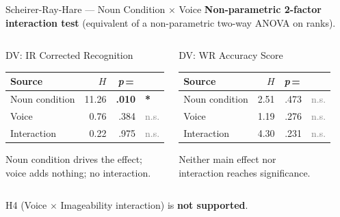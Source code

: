 \documentclass[aspectratio=169, 10pt]{beamer}
\newcommand{\pval}[1]{\textit{p}\,=\,#1}
\newcommand{\sig}[1]{\textcolor{red!70!black}{\textbf{#1}}}
\newcommand{\ns}[1]{\textcolor{gray}{#1}}
\begin{document}
\begin{frame}{Scheirer-Ray-Hare — Noun Condition $\times$ Voice}
  \textbf{Non-parametric 2-factor interaction test} (equivalent of a
  non-parametric two-way ANOVA on ranks).
  \vspace{0.5em}
  \begin{columns}[T]
      \begin{block}{DV: IR Corrected Recognition}
        \small
        \renewcommand{\arraystretch}{1.2}
        \begin{tabular}{lrrl}
          \toprule
          Source & $H$ & \pval{} & \\
          \midrule
          Noun condition & 11.26 & \sig{.010} & \sig{*} \\
          Voice          &  0.76 & .384 & \ns{n.s.} \\
          Interaction    &  0.22 & .975 & \ns{n.s.}  \\
          \bottomrule
        \end{tabular}
        \vspace{4pt}
        Noun condition drives the effect;\\
        voice adds nothing; no interaction.
      \end{block}

      \begin{block}{DV: WR Accuracy Score}
        \small
        \renewcommand{\arraystretch}{1.2}
        \begin{tabular}{lrrl}
          \toprule
          Source & $H$ & \pval{} & \\
          \midrule
          Noun condition &  2.51 & .473 & \ns{n.s.} \\
          Voice          &  1.19 & .276 & \ns{n.s.} \\
          Interaction    &  4.30 & .231 & \ns{n.s.}  \\
          \bottomrule
        \end{tabular}
        \vspace{4pt}
        Neither main effect nor\\
        interaction reaches significance.
      \end{block}
  \end{columns}
  \vspace{0.4em}
  \small H4 (Voice $\times$ Imageability interaction) is \textbf{not supported}.
\end{frame}
\end{document}
